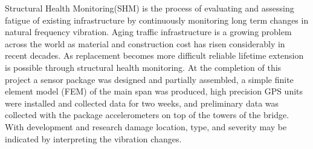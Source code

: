 Structural Health Monitoring(SHM) is the process of evaluating and assessing fatigue of existing infrastructure by continuously monitoring  long term changes in
natural frequency vibration.
Aging traffic infrastructure is a growing problem across the world as material and construction cost has risen considerably in
recent decades.
As replacement becomes more difficult reliable lifetime extension is possible through structural health monitoring.
At the completion of this project a sensor package was designed and partially assembled, a simple finite element model (FEM) of the main span was produced, high precision
GPS units were installed and collected data for two weeks, and preliminary data was collected with the package accelerometers on top of the towers of
the bridge.
With development and research damage location, type, and severity may be indicated by interpreting the vibration changes. 


